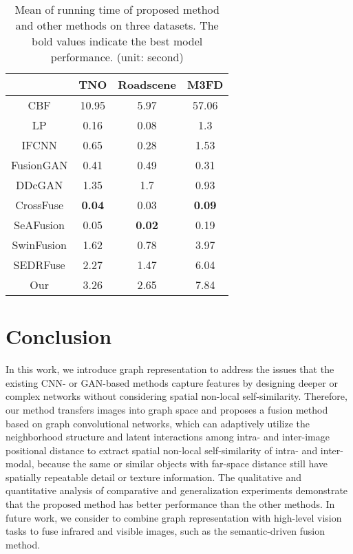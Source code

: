 \documentclass[journal]{IEEEtran}
\begin{document}
\begin{table}[]
\centering
\caption{Mean of running time of proposed method and other methods on three datasets. The bold values indicate the best model performance. (unit: second)}
\setlength{\tabcolsep}{5.5 mm}
\renewcommand\arraystretch{1.1}{
\begin{tabular}{cccc}
\hline
           & TNO           & Roadscene     & M3FD          \\ \hline
CBF        & 10.95         & 5.97          & 57.06         \\
LP         & 0.16          & 0.08          & 1.3           \\
IFCNN      & 0.65          & 0.28          & 1.53          \\
FusionGAN  & 0.41          & 0.49          & 0.31          \\
DDcGAN     & 1.35          & 1.7           & 0.93          \\
CrossFuse  & \textbf{0.04} & 0.03          & \textbf{0.09} \\
SeAFusion  & 0.05          & \textbf{0.02} & 0.19          \\
SwinFusion & 1.62          & 0.78          & 3.97          \\
SEDRFuse   & 2.27          & 1.47          & 6.04          \\
Our        & 3.26          & 2.65          & 7.84          \\ \hline
\end{tabular}}
\end{table}

\section{Conclusion}
In this work, we introduce graph representation to address the issues that the existing CNN- or GAN-based methods capture features by designing deeper or complex networks without considering spatial non-local self-similarity. Therefore, our method transfers images into graph space and proposes a fusion method based on graph convolutional networks, which can adaptively utilize the neighborhood structure and latent interactions among intra- and inter-image positional distance to extract spatial non-local self-similarity of intra- and inter-modal, because the same or similar objects with far-space distance still have spatially repeatable detail or texture information. The qualitative and quantitative analysis of comparative and generalization experiments demonstrate that the proposed method has better performance than the other methods. In future work, we consider to combine graph representation with high-level vision tasks to fuse infrared and visible images, such as the semantic-driven fusion method.
\end{document}
